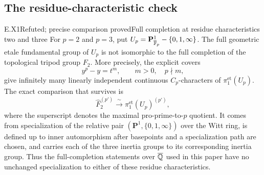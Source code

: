 \subsection{The residue-characteristic check}

\begin{result}{E.X1}{Refuted; precise comparison proved}{Full completion at residue characteristics two and three}
For $p=2$ and $p=3$, put
$U_p=\mathbf P^1_{\overline{\mathbb F}_p}-\{0,1,\infty\}$.
The full geometric etale fundamental group of $U_p$ is
not isomorphic to the full completion of the topological
tripod group $F_2$.  More precisely, the explicit covers
\[
                  y^p-y=t^m,\qquad m>0,\quad p\nmid m,
 \tag{E.X1}
\]
give infinitely many linearly independent continuous
$C_p$-characters of $\pi_1^{\mathrm{et}}(U_p)$.
The exact comparison that survives is
\[
 \widehat F_2^{(p')}\xrightarrow{\ \sim\ }
             \pi_1^{\mathrm{et}}(U_p)^{(p')},
 \tag{E.X2}
\]
where the superscript denotes the maximal pro-prime-to-$p$
quotient.  It comes from specialization of the relative
pair $(\mathbf P^1,\{0,1,\infty\})$ over the Witt ring,
is defined up to inner automorphism after basepoints and
a specialization path are chosen, and carries each of
the three inertia groups to its corresponding inertia
group.  Thus the full-completion statements over
$\overline{\mathbb Q}$ used in this paper have no unchanged
specialization to either of these residue characteristics.
\end{result}

